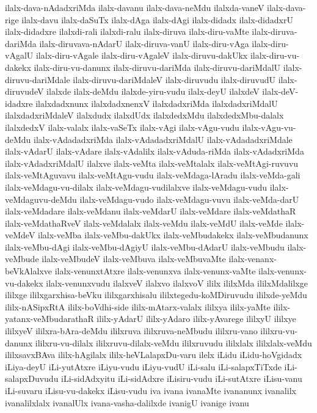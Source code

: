 {ilalx-dava-nAdadxriMda
ilalx-davanu
ilalx-dava-neMdu
ilalxda-vaneV
ilalx-dava-rige
ilalx-davu
ilalx-daSuTx
ilalx-dAga
ilalx-dAgi
ilalx-didadx
ilalx-didadxrU
ilalx-didadxre
ilalxdi-rali
ilalxdi-ralu
ilalx-diruva
ilalx-diru-vaMte
ilalx-diruva-dariMda
ilalx-diruvava-nAdarU
ilalx-diruva-vanU
ilalx-diru-vAga
ilalx-diru-vAgalU
ilalx-diru-vAgale
ilalx-diru-vAgaleV
ilalx-diruvu-dakUkx
ilalx-diru-vu-dakekx
ilalx-diru-vu-danunx
ilalx-diruvu-dariMda
ilalx-diruvu-dariMdalU
ilalx-diruvu-dariMdale
ilalx-diruvu-dariMdaleV
ilalx-diruvudu
ilalx-diruvudU
ilalx-diruvudeV
ilalxde
ilalx-deMdu
ilalxde-yiru-vudu
ilalx-deyU
ilalxdeV
ilalx-deV-idadxre
ilalxdadxnunx
ilalxdadxnenxV
ilalxdadxriMda
ilalxdadxriMdalU
ilalxdadxriMdaleV
ilalxdudx
ilalxdUdx
ilalxdedxMdu
ilalxdedxMbu-dalalx
ilalxdedxV
ilalx-valalx
ilalx-vaSeTx
ilalx-vAgi
ilalx-vAgu-vudu
ilalx-vAgu-vu-deMdu
ilalx-vAdadadxriMda
ilalx-vAdadadxriMdalU
ilalx-vAdadadxriMdale
ilalx-vAdarU
ilalx-vAdare
ilalx-vAdalilx
ilalx-vAduda-riMda
ilalx-vAdadxriMda
ilalx-vAdadxriMdalU
ilalxve
ilalx-veMta
ilalx-veMtalalx
ilalx-veMtAgi-ruvuvu
ilalx-veMtAguvavu
ilalx-veMtAgu-vudu
ilalx-veMdaga-lAradu
ilalx-veMda-gali
ilalx-veMdagu-vu-dilalx
ilalx-veMdagu-vudilalxve
ilalx-veMdagu-vudu
ilalx-veMdaguvu-deMdu
ilalx-veMdagu-vudo
ilalx-veMdagu-vuvu
ilalx-veMda-darU
ilalx-veMdadare
ilalx-veMdanu
ilalx-veMdarU
ilalx-veMdare
ilalx-veMdathaR
ilalx-veMdathaRveV
ilalx-veMdalalx
ilalx-veMdu
ilalx-veMdU
ilalx-veMde
ilalx-veMdeV
ilalx-veMba
ilalx-veMbu-dakUkx
ilalx-veMbudakekx
ilalx-veMbudanunx
ilalx-veMbu-dAgi
ilalx-veMbu-dAgiyU
ilalx-veMbu-dAdarU
ilalx-veMbudu
ilalx-veMbude
ilalx-veMbudeV
ilalx-veMbuva
ilalx-veMbuvaMte
ilalx-venanx-beVkAlalxve
ilalx-venunxtAtxre
ilalx-venunxva
ilalx-venunx-vaMte
ilalx-venunx-vu-dakekx
ilalx-venunxvudu
ilalxveV
ilalxvo
ilalxvoV
ililx
ililxMda
ililxMdalilxge
ililxge
ililxgarxhisa-beVku
ililxgarxhisalu
ililxtegedu-koMDiruvudu
ililxde-yeMdu
ililx-nASipxRtA
ililx-boVdhi-side
ililx-mAtarx-valalx
ililxya
ililx-yaMte
ililx-yatanx-veMbudarathaR
ililx-yAdarU
ililx-yAdaro
ililx-yAvarege
ililxyU
ililxye
ililxyeV
ililxra-bAra-deMdu
ililxruva
ililxruva-neMbudu
ililxru-vano
ililxru-vu-danunx
ililxru-vu-dilalx
ililxruvu-dilalx-veMdu
ililxruvudu
ililxlalx
ililxlalx-veMdu
ililxsavxBAva
ililx-hAgilalx
ililx-heVLalapxDu-varu
ilelx
iLidu
iLidu-hoVgidadx
iLiya-deyU
iLi-yutAtxre
iLiyu-vudu
iLiyu-vudU
iLi-salu
iLi-salapxTiTxde
iLi-salapxDuvudu
iLi-sidAdxyitu
iLi-sidAdxre
iLisiru-vudu
iLi-sutAtxre
iLisu-vanu
iLi-suvaru
iLisu-vu-dakekx
iLisu-vudu
iva
ivana
ivanaMte
ivananunx
ivanalilx
ivanalilxlalx
ivanalUlx
ivana-vasha-dalilxde
ivanigU
ivanige
ivanu
}
